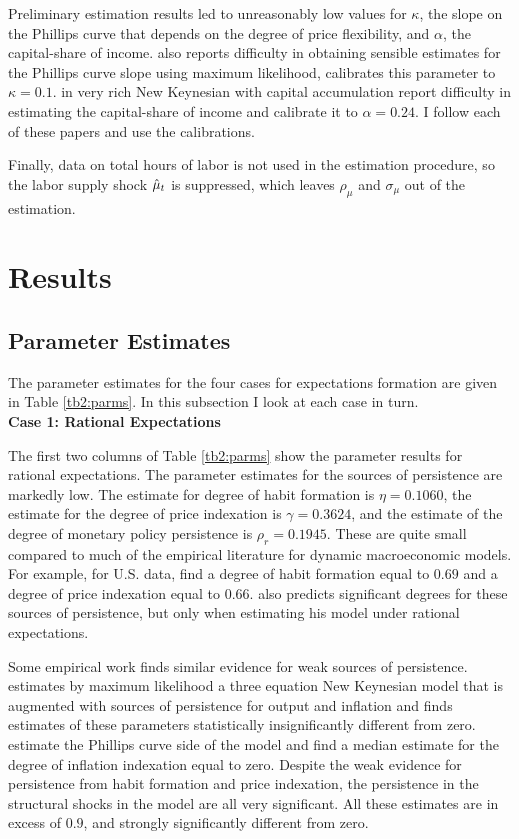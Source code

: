 Preliminary estimation results led to unreasonably low values for $\kappa$, the slope on the Phillips curve that depends on the degree of price flexibility, and $\alpha$, the capital-share of income.   also reports difficulty in obtaining sensible estimates for the Phillips curve slope using maximum likelihood, calibrates this parameter to $\kappa=0.1$.   in very rich New Keynesian with capital accumulation report difficulty in estimating the capital-share of income and calibrate it to $\alpha=0.24$.  I follow each of these papers and use the calibrations.

Finally, data on total hours of labor is not used in the estimation procedure, so the labor supply shock $\hat{\mu}_t$ is suppressed, which leaves $\rho_{\mu}$ and $\sigma_{\mu}$ out of the estimation.

\section{Results}
\subsection{Parameter Estimates}
The parameter estimates for the four cases for expectations formation are given in Table \ref{tb2:parms}.  In this subsection I look at each case in turn. \\

\noindent \textbf{Case 1: Rational Expectations}

The first two columns of Table \ref{tb2:parms} show the parameter results for rational expectations.  The parameter estimates for the sources of persistence are markedly low.  The estimate for degree of habit formation is $\eta=0.1060$, the estimate for the degree of price indexation is $\gamma=0.3624$, and the estimate of the degree of monetary policy persistence is $\rho_r=0.1945$.  These are quite small compared to much of the empirical literature for dynamic macroeconomic models.  For example, for U.S. data,  find a degree of habit formation equal to $0.69$ and a degree of price indexation equal to $0.66$.   also predicts significant degrees for these sources of persistence, but only when estimating his model under rational expectations.  

Some empirical work finds similar evidence for weak sources of persistence.   estimates by maximum likelihood a three equation New Keynesian model that is augmented with sources of persistence for output and inflation and finds estimates of these parameters statistically insignificantly different from zero.   estimate the Phillips curve side of the model and find a median estimate for the degree of inflation indexation equal to zero.  Despite the weak evidence for persistence from habit formation and price indexation, the persistence in the structural shocks in the model are all very significant.  All these estimates are in excess of $0.9$, and strongly significantly different from zero.

